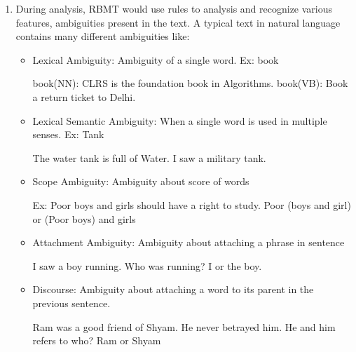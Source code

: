     \begin{enumerate}
        \item During analysis, RBMT would use rules to analysis and recognize various features, ambiguities present in the text. A typical text in natural language contains many different ambiguities like\cite{NLPAmbiguity}:
        
        \begin{itemize}
            \item Lexical Ambiguity: Ambiguity of a single word. Ex: book
            \begin{flushleft}
            book(NN): CLRS is the foundation book in Algorithms.\linebreak
            book(VB): Book a return ticket to Delhi.\linebreak
            \end{flushleft}
            
            \item Lexical Semantic Ambiguity: When a single word is used in multiple senses. Ex: Tank
            \begin{flushleft}
            The water tank is full of Water. \linebreak
            I saw a military tank.
            \end{flushleft}
            
            \item Scope Ambiguity: Ambiguity about score of words
            \begin{flushleft}
            Ex: Poor boys and girls should have a right to study.\linebreak
            Poor (boys and girl) or (Poor boys) and girls
            \end{flushleft}
            
            \item Attachment Ambiguity: Ambiguity about attaching a phrase in sentence
            \begin{flushleft}
            I saw a boy running.\linebreak
            Who was running? I or the boy.
            \end{flushleft}
            
            \item Discourse: Ambiguity about attaching a word to its parent in the previous sentence.
            \begin{flushleft}
            Ram was a good friend of Shyam. He never betrayed him.\linebreak 
            He and him refers to who? Ram or Shyam
            \end{flushleft}
            

\end{itemize}
\end{enumerate}
